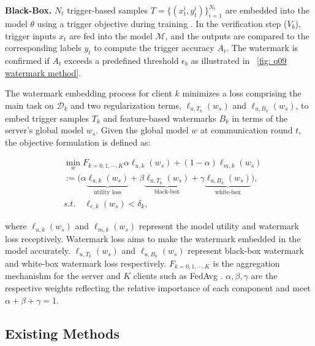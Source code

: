 \textbf{Black-Box.} \(N_t\) trigger-based samples \(T = \{ (x^i_t, y^i_t) \}_{i=1}^{N_t}\) are embedded into the model \(\theta\) using a trigger objective during training \cite{li2022fedipr}. In the verification step (\(V_b\)), trigger inputs \(x_t\) are fed into the model \(\mathcal{M}\), and the outputs are compared to the corresponding labels \(y_t\) to compute the trigger accuracy \(A_t\). The watermark is confirmed if \(A_t\) exceeds a predefined threshold \(\epsilon_b\) as illustrated in \fig~\ref{fig: q09 watermark method}.


The watermark embedding process for client \( k \) minimizes a loss comprising the main task on \( \mathcal{D}_k \) and two regularization terms, \( \ell_{u,T_k}(w_s) \) and \( \ell_{u,B_k}(w_s) \), to embed trigger samples \( T_k \) and feature-based watermarks \( B_k \) in terms of the server's global model $w_s$. Given the global model $w$ at communication round \( t \), the objective formulation is defined as:

\begin{equation}
\begin{split}
      & \min_wF_{k=0,1,\cdots, K}\alpha\ell_{u,k}(w_s)+(1-\alpha)\ell_{m,k}(w_s) \\
       &:=\Big(\alpha\underbrace{\ell_{u,k}(w_s)}_{\text{utility loss}} 
    + \beta\underbrace{\ell_{u,T_k}(w_s)}_{\text{black-box}} 
    + \gamma\underbrace{\ell_{u,B_k}(w_s)}_{\text{white-box}} \Big), \\
    &s.t. \quad \ell_{e,k}(w_s)<\delta_k,
\end{split}
\end{equation}

where $\ell_{u,k}(w_s)$ and $\ell_{m,k}(w_s)$  represent the model utility and watermark loss receptively. Watermark loss aims to make the watermark embedded in the model accurately. $\ell_{u,T_k}(w_s)$ and  $\ell_{u,B_k}(w_s)$ represent black-box watermark and white-box watermark loss respectively. $F_{k=0,1,\cdots, K}$ is the aggregation mechanishm for the server and $K$ clients such as FedAvg \cite{mcmahan2017communication}.  $\alpha,\beta,\gamma$ are the respective weights reflecting the relative importance of each component and meet $\alpha+\beta+\gamma=1$.


\subsection{Existing Methods}

